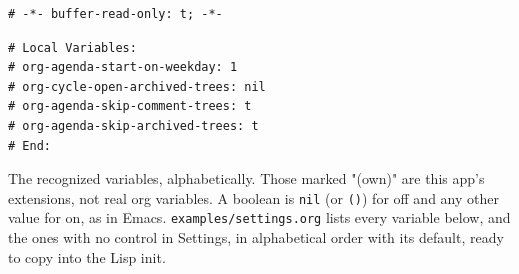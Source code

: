 \documentclass[11pt]{article}
\begin{document}
\begin{verbatim}
# -*- buffer-read-only: t; -*-
\end{verbatim}

\begin{verbatim}
# Local Variables:
# org-agenda-start-on-weekday: 1
# org-cycle-open-archived-trees: nil
# org-agenda-skip-comment-trees: t
# org-agenda-skip-archived-trees: t
# End:
\end{verbatim}

The recognized variables, alphabetically. Those marked "(own)" are this app's extensions, not real org variables. A boolean is \texttt{nil} (or \texttt{()}) for off and any other value for on, as in Emacs. \texttt{examples/settings.org} lists every variable below, and the ones with no control in Settings, in alphabetical order with its default, ready to copy into the Lisp init.
\end{document}
